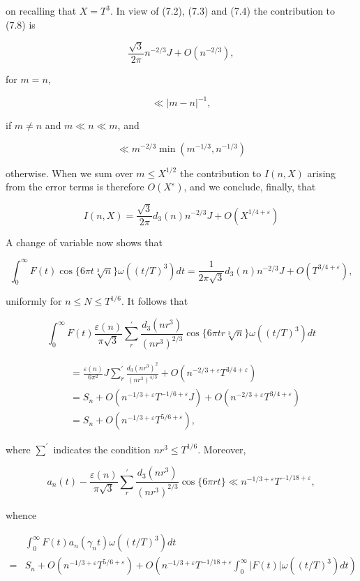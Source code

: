 \documentclass[10pt]{article}
\begin{document}
on recalling that $X=T^{3}$. In view of (7.2), (7.3) and (7.4) the contribution to (7.8) is

$$
\frac{\sqrt{3}}{2 \pi} n^{-2 / 3} J+O\left(n^{-2 / 3}\right),
$$

for $m=n$,

$$
\ll|m-n|^{-1},
$$

if $m \neq n$ and $m \ll n \ll m$, and

$$
\ll m^{-2 / 3} \min \left(m^{-1 / 3}, n^{-1 / 3}\right)
$$

otherwise. When we sum over $m \leq X^{1 / 2}$ the contribution to $I(n, X)$ arising from the error terms is therefore $O\left(X^{\varepsilon}\right)$, and we conclude, finally, that

$$
I(n, X)=\frac{\sqrt{3}}{2 \pi} d_{3}(n) n^{-2 / 3} J+O\left(X^{1 / 4+\varepsilon}\right)
$$

A change of variable now shows that

$$
\int_{0}^{\infty} F(t) \cos \{6 \pi t \sqrt[3]{n}\} \omega\left((t / T)^{3}\right) d t=\frac{1}{2 \pi \sqrt{3}} d_{3}(n) n^{-2 / 3} J+O\left(T^{3 / 4+\varepsilon}\right),
$$

uniformly for $n \leq N \leq T^{1 / 6}$. It follows that

$$
\int_{0}^{\infty} F(t) \frac{\varepsilon(n)}{\pi \sqrt{3}} \sum_{r}^{\prime} \frac{d_{3}\left(n r^{3}\right)}{\left(n r^{3}\right)^{2 / 3}} \cos \{6 \pi t r \sqrt[3]{n}\} \omega\left((t / T)^{3}\right) d t
$$

$$
\begin{aligned}
& =\frac{\varepsilon(n)}{6 \pi^{2}} J \sum_{r}^{\prime} \frac{d_{3}\left(n r^{3}\right)^{2}}{\left(n r^{3}\right)^{4 / 3}}+O\left(n^{-2 / 3+\varepsilon} T^{3 / 4+\varepsilon}\right) \\
& =S_{n}+O\left(n^{-1 / 3+\varepsilon} T^{-1 / 6+\varepsilon} J\right)+O\left(n^{-2 / 3+\varepsilon} T^{3 / 4+\varepsilon}\right) \\
& =S_{n}+O\left(n^{-1 / 3+\varepsilon} T^{5 / 6+\varepsilon}\right),
\end{aligned}
$$

where $\sum^{\prime}$ indicates the condition $n r^{3} \leq T^{1 / 6}$. Moreover,

$$
a_{n}(t)-\frac{\varepsilon(n)}{\pi \sqrt{3}} \sum_{r}^{\prime} \frac{d_{3}\left(n r^{3}\right)}{\left(n r^{3}\right)^{2 / 3}} \cos \{6 \pi r t\} \ll n^{-1 / 3+\varepsilon} T^{-1 / 18+\varepsilon},
$$

whence

$$
\begin{aligned}
& \int_{0}^{\infty} F(t) a_{n}\left(\gamma_{n} t\right) \omega\left((t / T)^{3}\right) d t \\
= & S_{n}+O\left(n^{-1 / 3+\varepsilon} T^{5 / 6+\varepsilon}\right)+O\left(n^{-1 / 3+\varepsilon} T^{-1 / 18+\varepsilon} \int_{0}^{\infty}|F(t)| \omega\left((t / T)^{3}\right) d t\right)
\end{aligned}
$$
\end{document}
